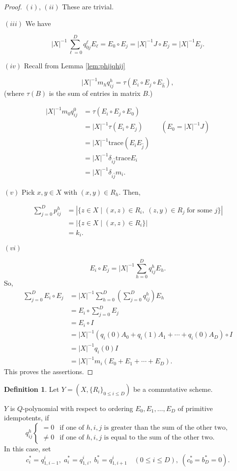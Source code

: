 \documentclass[
]{book}
\theoremstyle{definition}
\newtheorem{definition}{Definition}[chapter]
\theoremstyle{definition}
\theoremstyle{definition}
\theoremstyle{definition}
\theoremstyle{remark}
\begin{document}
\begin{proof}
\leavevmode

\((i)\), \((ii)\) These are trivial.

\((iii)\) We have

\[|X|^{-1}\sum_{\ell = 0}^D q^\ell_{0j} E_\ell  = E_0 \circ E_j = |X|^{-1}J\circ E_j = |X|^{-1}E_j.\]

\((iv)\) Recall from Lemma \ref{lem:phijqhij}

\[|X|^{-1}m_h q^h_{ij} = \tau(E_i\circ E_j \circ E_{\hat{h}}),\]
(where \(\tau(B)\) is the sum of entries in matrix \(B\).)

\begin{align}
|X|^{-1}m_0q^0_{ij} & = \tau(E_i\circ E_j\circ E_0) \\
& = |X|^{-1}\tau(E_i\circ E_j) && (E_0 = |X|^{-1}J)\\
& = |X|^{-1}\mathrm{trace}(E_iE_{\hat{j}})\\
& = |X|^{-1}\delta_{i\hat{j}}\mathrm{trace}E_i\\
& = |X|^{-1}\delta_{i\hat{j}}m_i.
\end{align}

\((v)\) Pick \(x,y\in X\) with \((x,y)\in R_h\). Then,

\begin{align}
\sum_{j=0}^D p^h_{ij} & = |\{z\in X\mid (x,z)\in R_i, \; (z,y)\in R_j \; \text{for some $j$}\}|\\
& = |\{z\in X\mid (x,z)\in R_i\}|\\
& = k_i.
\end{align}

\((vi)\)

\[E_i \circ E_j = |X|^{-1}\sum_{h=0}^D q^h_{ij}E_h.\]
So,
\begin{align}
\sum_{j=0}^D E_i\circ E_j & = |X|^{-1}\sum_{h=0}^D \left(\sum_{j=0}^D q^h_{ij}\right) E_h\\
& = E_i \circ \sum_{j=0}^D E_j\\
& = E_i\circ I\\
& = |X|^{-1}(q_i(0)A_0 + q_i(1)A_1 + \cdots + q_i(0)A_D)\circ I\\
& = |X|^{-1}q_i(0)I\\
& = |X|^{-1}m_i(E_0 + E_1 + \cdots + E_D).
\end{align}
This proves the assertions.

\end{proof}

\begin{definition}
\protect\hypertarget{def:q-polynomial}{}\label{def:q-polynomial}Let \(Y = (X, \{R_i\}_{0\leq i\leq D})\) be a commutative scheme.

\(Y\) is \(Q\)-polynomial  with respect to ordering \(E_0, E_1, \ldots, E_D\) of primitive idempotents, if
\[q^h_{ij} \begin{cases} = 0 & \text{if one of $h, i, j$ is greater than the sum of the other two,}\\
\neq 0 & \text{if one of $h,i,j$ is equal to the sum of the other two.}\end{cases}\]
In this case, set
\[c^*_i = q^i_{1,i-1}, \; a^*_i = q^i_{1,i}, \; b^*_i = q^i_{1,i+1} \quad (0\leq i\leq D), \;(c^*_0= b^*_D = 0).\]
\end{definition}
\end{document}
